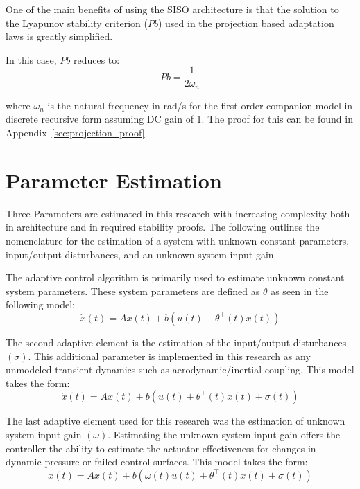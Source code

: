 One of the main benefits of using the \ac{SISO} architecture is that the solution to the Lyapunov stability criterion ($Pb$) used in the projection based adaptation laws is greatly simplified.  

In this case, $Pb$ reduces to:
\begin{equation}
Pb = \frac{1}{2\omega_n}
\end{equation}

where $\omega_n$ is the natural frequency in rad/s for the first order companion model in discrete recursive form assuming DC gain of 1.  The proof for this can be found in Appendix~\ref{sec:projection_proof}.

\section{\Lone Parameter Estimation}\label{sec:param_estimation}
Three Parameters are estimated in this research with increasing complexity both in architecture and in required stability proofs.  The following outlines the nomenclature for the estimation of a system with unknown constant parameters, input/output disturbances, and an unknown system input gain.

The \Lone adaptive control algorithm is primarily used to estimate unknown constant system parameters.  These system parameters are defined as $\theta$ as seen in the following model:
\begin{equation}
\dot{x}(t)=Ax(t)+b(u(t)+\theta^{\top}(t)x(t))
\end{equation}

The second adaptive element is the estimation of the input/output disturbances $(\sigma)$.  This additional parameter is implemented in this research as any unmodeled transient dynamics such as aerodynamic/inertial coupling.  This model takes the form:
\begin{equation}
\dot{x}(t)=Ax(t)+b(u(t)+\theta^{\top}(t)x(t)+\sigma(t))
\end{equation}

The last adaptive element used for this research was the estimation of unknown system input gain $(\omega)$.  Estimating the unknown system input gain offers the controller the ability to estimate the actuator effectiveness for changes in dynamic pressure or failed control surfaces.  This model takes the form:
\begin{equation}\label{eq:l_one_model}
\dot{x}(t)=Ax(t)+b(\omega(t)u(t)+\theta^{\top}(t)x(t)+\sigma(t))
\end{equation}  

